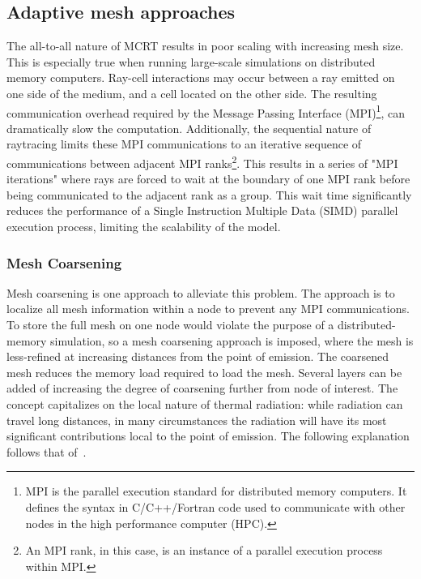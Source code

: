 \subsection{Adaptive mesh approaches}
The all-to-all nature of MCRT results in poor scaling with increasing mesh size. 
This is especially true when running large-scale simulations on distributed memory computers.
Ray-cell interactions may occur between a ray emitted on one side of the medium, and a cell located on the other side.
The resulting communication overhead required by the Message Passing Interface (MPI)\footnote{MPI is the parallel execution standard for distributed memory computers. It defines the syntax in C/C++/Fortran code used to communicate with other nodes in the high performance computer (HPC).}, can dramatically slow the computation. Additionally, the sequential nature of raytracing limits these MPI communications to an iterative sequence of communications between adjacent MPI ranks\footnote{An MPI rank, in this case, is an instance of a parallel execution process within MPI.}.
This results in a series of "MPI iterations" where rays are forced to wait at the boundary of one MPI rank before being communicated to the adjacent rank as a group. This wait time significantly reduces the performance of a Single Instruction Multiple Data (SIMD) parallel execution process, limiting the scalability of the model.

\subsubsection{Mesh Coarsening}
Mesh coarsening is one approach to alleviate this problem. The approach is to localize all mesh information within a node to prevent any MPI communications.
To store the full mesh on one node would violate the purpose of a distributed-memory simulation, so a mesh coarsening approach is imposed, where the mesh is less-refined at increasing distances from the point of emission.
The coarsened mesh reduces the memory load required to load the mesh. Several layers can be added of increasing the degree of coarsening further from node of interest. The concept capitalizes on the local nature of thermal radiation: 
while radiation can travel long distances, in many circumstances the radiation will have its most significant contributions local to the point of emission.
The following explanation follows that of~\citet{Silvestri2019ASimulation}.

